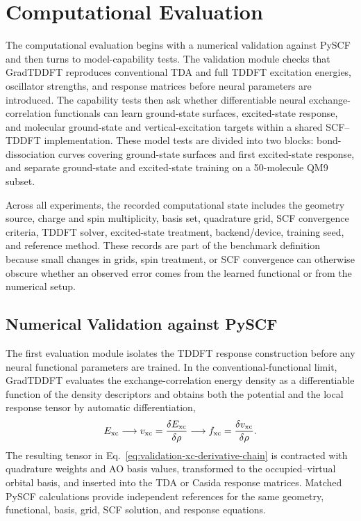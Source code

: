 \section{Computational Evaluation}
\label{sec:results}

The computational evaluation begins with a numerical validation
against PySCF and then turns to model-capability tests. The validation
module checks that GradTDDFT reproduces conventional TDA and full
TDDFT excitation energies, oscillator strengths, and response
matrices before neural parameters are introduced. The capability
tests then ask whether differentiable neural exchange-correlation
functionals can learn ground-state surfaces, excited-state response,
and molecular ground-state and vertical-excitation targets
within a shared SCF--TDDFT implementation. These model tests are
divided into two blocks: bond-dissociation curves covering
ground-state surfaces and first excited-state response, and
separate ground-state and excited-state training on a 50-molecule QM9
subset.

Across all experiments, the recorded computational state includes the
geometry source, charge and spin multiplicity, basis set, quadrature
grid, SCF convergence criteria, TDDFT solver, excited-state treatment,
backend/device, training seed, and reference method. These records are
part of the benchmark definition because small changes in grids,
spin treatment, or SCF convergence can otherwise obscure whether an
observed error comes from the learned functional or from the numerical
setup.

\subsection{Numerical Validation against PySCF}
\label{sec:eval-pyscf}

The first evaluation module isolates the TDDFT response construction
before any neural functional parameters are trained. In the
conventional-functional limit, GradTDDFT evaluates the
exchange-correlation energy density as a differentiable function of
the density descriptors and obtains both the potential and the local
response tensor by automatic differentiation,
\begin{equation}
  E_{\rm xc}
  \longrightarrow
  v_{\rm xc}
  =
  \frac{\delta E_{\rm xc}}{\delta \rho}
  \longrightarrow
  f_{\rm xc}
  =
  \frac{\delta v_{\rm xc}}{\delta \rho}.
  \label{eq:validation-xc-derivative-chain}
\end{equation}
The resulting tensor in
Eq.~\eqref{eq:validation-xc-derivative-chain} is contracted with
quadrature weights and AO basis values, transformed to the
occupied--virtual orbital basis, and inserted into the TDA or Casida
response matrices. Matched PySCF
calculations provide independent references for the same geometry,
functional, basis, grid, SCF solution, and response equations.

